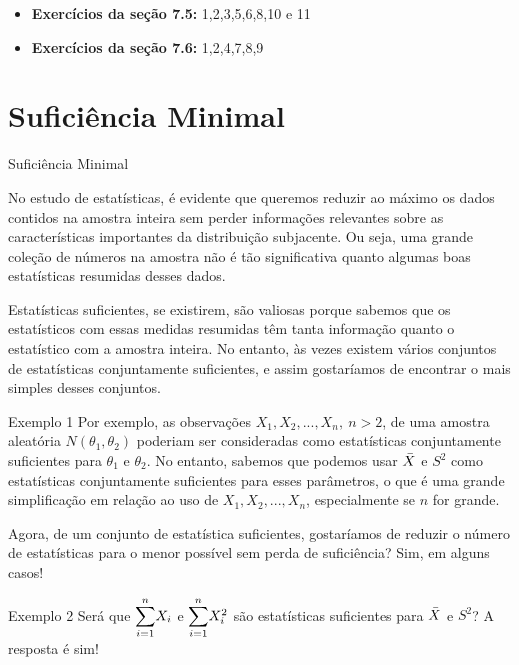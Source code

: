 \documentclass[12pt]{beamer}
\begin{document}
\begin{frame}{}
\begin{block}{\Home}
\justifying
\begin{itemize}
    \item \textbf{Exercícios da seção 7.5:} 1,2,3,5,6,8,10 e 11
    \item \textbf{Exercícios da seção 7.6:} 1,2,4,7,8,9
\end{itemize}
\nocite{hogg, casella2021statistical, bolfarine}
\end{block}
\end{frame}

\section{Suficiência Minimal}
\begin{frame}{Suficiência Minimal}
\begin{block}{}
\justifying
No estudo de estatísticas, é evidente que queremos reduzir ao máximo os dados contidos na amostra inteira sem perder informações relevantes sobre as características importantes da distribuição subjacente. Ou seja, uma grande coleção de números na amostra não é tão significativa quanto algumas boas estatísticas resumidas desses dados. 
\end{block}
\pause
\begin{block}{}
\justifying
Estatísticas suficientes, se existirem, são valiosas porque sabemos que os estatísticos com essas medidas resumidas têm tanta informação quanto o estatístico com a amostra inteira. No entanto, às vezes existem vários conjuntos de estatísticas conjuntamente suficientes, e assim gostaríamos de encontrar o mais simples desses conjuntos.
\end{block}
\end{frame}

\begin{frame}{}

\begin{block}{Exemplo 1}
\justifying
Por exemplo, as observações $X_1, X_2, ..., X_n,~n > 2$, de uma amostra aleatória $N(\theta_1, \theta_2)$ poderiam ser consideradas como estatísticas conjuntamente suficientes para $\theta_1$ e $\theta_2$. No entanto, sabemos que podemos usar $\Bar{X}$ e $S^2$ como estatísticas conjuntamente suficientes para esses parâmetros, o que é uma grande simplificação em relação ao uso de $X_1, X_2, ..., X_n$, especialmente se $n$ for grande.
\end{block}
\pause
\begin{block}{}
\justifying
Agora, de um conjunto de estatística suficientes, gostaríamos de reduzir o número de estatísticas para o menor possível sem perda de suficiência? Sim, em alguns casos!
\end{block}
\pause
\begin{block}{Exemplo 2}
\justifying
Será que ${\displaystyle \sum_{i=1}^{n}} X_{i}$ e ${\displaystyle \sum_{i=1}^{n}} X_{i}^{2}$ são estatísticas suficientes para $\Bar{X}$ e $S^2$? {\pause A resposta é sim!}
\end{block}
\end{frame}
\end{document}

